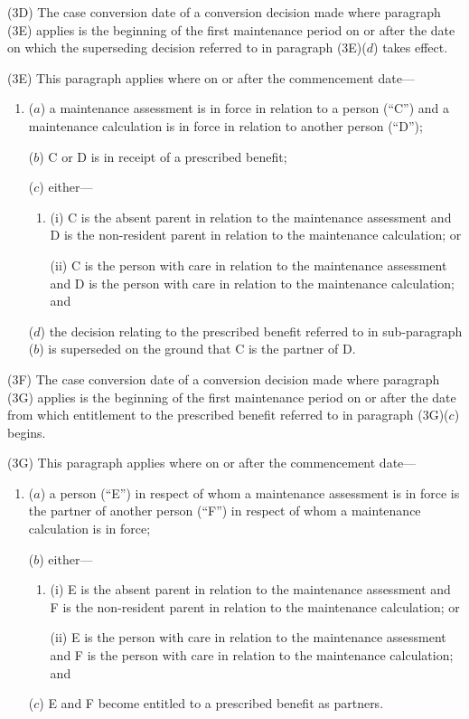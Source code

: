 \documentclass[12pt,a4paper]{article}
\begin{document}
(3D) The case conversion date of a conversion decision made where paragraph (3E) applies is the beginning of the first maintenance period on or after the date on which the superseding decision referred to in paragraph (3E)($d$)  takes effect.

(3E) This paragraph applies where on or after the commencement date—
\begin{enumerate}\item[]
($a$) a maintenance assessment is in force in relation to a person (“C”) and a maintenance calculation is in force in relation to another person (“D”);

($b$) C or D is in receipt of a prescribed benefit;

($c$) either—
\begin{enumerate}\item[]
(i) C is the absent parent in relation to the maintenance assessment and D is the non-resident parent in relation to the maintenance calculation; or

(ii) C is the person with care in relation to the maintenance assessment and D is the person with care in relation to the maintenance calculation; and
\end{enumerate}

($d$) the decision relating to the prescribed benefit referred to in sub-paragraph ($b$)  is superseded on the ground that C is the partner of D.
\end{enumerate}

(3F) The case conversion date of a conversion decision made where paragraph (3G) applies is the beginning of the first maintenance period on or after the date from which entitlement to the prescribed benefit referred to in paragraph (3G)($c$)  begins.

(3G) This paragraph applies where on or after the commencement date—
\begin{enumerate}\item[]
($a$) a person (“E”) in respect of whom a maintenance assessment is in force is the partner of another person (“F”) in respect of whom a maintenance calculation is in force;

($b$) either—
\begin{enumerate}\item[]
(i) E is the absent parent in relation to the maintenance assessment and F is the non-resident parent in relation to the maintenance calculation; or

(ii) E is the person with care in relation to the maintenance assessment and F is the person with care in relation to the maintenance calculation; and
\end{enumerate}

($c$) E and F become entitled to a prescribed benefit as partners.
\end{enumerate}
\end{document}
